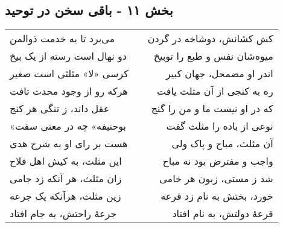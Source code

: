 \begin{center}
\section*{بخش ۱۱ - باقی سخن در توحید}
\label{sec:011}
\begin{longtable}{l p{0.5cm} r}
می‌برد تا به خدمت ذوالمن
&&
کش کشانش، دوشاخه در گردن
\\
دو نهال است رسته از یک بیخ
&&
میوه‌شان نفس و طبع را توبیخ
\\
کرسی «لا» مثلثی است صغیر
&&
اندر او مضمحل، جهان کبیر
\\
هرکه رو از وجود محدث تافت
&&
ره به کنجی از آن مثلث یافت
\\
عقل داند، ز تنگی هر کنج
&&
که در او نیست ما و من را گنج
\\
«بوحنیفه» چه در معنی سفت
&&
نوعی از باده را مثلث گفت
\\
هست بر رای او به شرح هدی
&&
آن مثلث، مباح و پاک ولی
\\
این مثلث، به کیش اهل فلاح
&&
واجب و مفترض بود نه مباح
\\
زان مثلث، هر آنکه زد جامی
&&
شد ز مستی، زبون هر خامی
\\
زین مثلث، هرآنکه یک جرعه
&&
خورد، بختش به نام زد قرعه
\\
جرعهٔ راحتش، به جام افتاد
&&
قرعهٔ دولتش، به نام افتاد
\\
\end{longtable}
\end{center}

